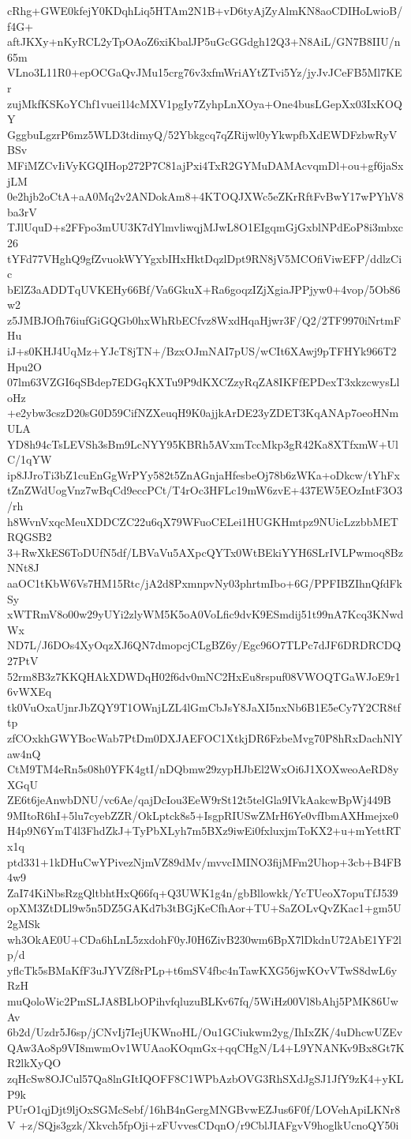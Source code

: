 cRhg+GWE0kfejY0KDqhLiq5HTAm2N1B+vD6tyAjZyAlmKN8aoCDIHoLwioB/f4G+
aftJKXy+nKyRCL2yTpOAoZ6xiKbalJP5uGcGGdgh12Q3+N8AiL/GN7B8IIU/n65m
VLno3L11R0+epOCGaQvJMu15crg76v3xfmWriAYtZTvi5Yz/jyJvJCeFB5Ml7KEr
zujMkfKSKoYChf1vuei1l4cMXV1pgIy7ZyhpLnXOya+One4busLGepXx03IxKOQY
GggbuLgzrP6mz5WLD3tdimyQ/52Ybkgcq7qZRijwl0yYkwpfbXdEWDFzbwRyVBSv
MFiMZCvIiVyKGQIHop272P7C81ajPxi4TxR2GYMuDAMAcvqmDl+ou+gf6jaSxjLM
0e2hjb2oCtA+aA0Mq2v2ANDokAm8+4KTOQJXWc5eZKrRftFvBwY17wPYhV8ba3rV
TJlUquD+s2FFpo3mUU3K7dYlmvliwqjMJwL8O1EIgqmGjGxblNPdEoP8i3mbxc26
tYFd77VHghQ9gfZvuokWYYgxbIHxHktDqzlDpt9RN8jV5MCOfiViwEFP/ddlzCic
bElZ3aADDTqUVKEHy66Bf/Va6GkuX+Ra6goqzIZjXgiaJPPjyw0+4vop/5Ob86w2
z5JMBJOfh76iufGiGQGb0hxWhRbECfvz8WxdHqaHjwr3F/Q2/2TF9970iNrtmFHu
iJ+s0KHJ4UqMz+YJcT8jTN+/BzxOJmNAI7pUS/wCIt6XAwj9pTFHYk966T2Hpu2O
07lm63VZGI6qSBdep7EDGqKXTu9P9dKXCZzyRqZA8IKFfEPDexT3xkzcwysLloHz
+e2ybw3cszD20sG0D59CifNZXeuqH9K0ajjkArDE23yZDET3KqANAp7oeoHNmULA
YD8h94cTsLEVSh3sBm9LcNYY95KBRh5AVxmTccMkp3gR42Ka8XTfxmW+UlC/1qYW
ip8JJroTi3bZ1cuEnGgWrPYy582t5ZnAGnjaHfesbeOj78b6zWKa+oDkcw/tYhFx
tZnZWdUogVnz7wBqCd9eccPCt/T4rOc3HFLc19mW6zvE+437EW5EOzIntF3O3/rh
h8WvnVxqcMeuXDDCZC22u6qX79WFuoCELei1HUGKHmtpz9NUicLzzbbMETRQGSB2
3+RwXkES6ToDUfN5df/LBVaVu5AXpcQYTx0WtBEkiYYH6SLrIVLPwmoq8BzNNt8J
aaOC1tKbW6Vs7HM15Rtc/jA2d8PxmnpvNy03phrtmIbo+6G/PPFIBZIhnQfdFkSy
xWTRmV8o00w29yUYi2zlyWM5K5oA0VoLfic9dvK9ESmdij51t99nA7Kcq3KNwdWx
ND7L/J6DOs4XyOqzXJ6QN7dmopcjCLgBZ6y/Egc96O7TLPc7dJF6DRDRCDQ27PtV
52rm8B3z7KKQHAkXDWDqH02f6dv0mNC2HxEu8rspuf08VWOQTGaWJoE9r16vWXEq
tk0VuOxaUjnrJbZQY9T1OWnjLZL4lGmCbJsY8JaXI5nxNb6B1E5eCy7Y2CR8tftp
zfCOxkhGWYBocWab7PtDm0DXJAEFOC1XtkjDR6FzbeMvg70P8hRxDachNlYaw4nQ
CtM9TM4eRn5s08h0YFK4gtI/nDQbmw29zypHJbEl2WxOi6J1XOXweoAeRD8yXGqU
ZE6t6jeAnwbDNU/vc6Ae/qajDcIou3EeW9rSt12t5telGla9IVkAakcwBpWj449B
9MItoR6hI+5lu7cyebZZR/OkLptck8s5+IsgpRIUSwZMrH6Ye0vfIbmAXHmejxe0
H4p9N6YmT4l3FhdZkJ+TyPbXLyh7m5BXz9iwEi0fxluxjmToKX2+u+mYettRTx1q
ptd331+1kDHuCwYPivezNjmVZ89dMv/mvvcIMINO3fijMFm2Uhop+3cb+B4FB4w9
ZaI74KiNbsRzgQltbhtHxQ66fq+Q3UWK1g4n/gbBllowkk/YcTUeoX7opuTfJ539
opXM3ZtDLl9w5n5DZ5GAKd7b3tBGjKeCfhAor+TU+SaZOLvQvZKac1+gm5U2gMSk
wh3OkAE0U+CDa6hLnL5zxdohF0yJ0H6ZivB230wm6BpX7lDkdnU72AbE1YF2lp/d
yflcTk5sBMaKfF3uJYVZf8rPLp+t6mSV4fbc4nTawKXG56jwKOvVTwS8dwL6yRzH
muQoloWic2PmSLJA8BLbOPihvfqluzuBLKv67fq/5WiHz00Vl8bAhj5PMK86UwAv
6b2d/Uzdr5J6sp/jCNvIj7IejUKWnoHL/Ou1GCiukwm2yg/IhIxZK/4uDhcwUZEv
QAw3Ao8p9VI8mwmOv1WUAaoKOqmGx+qqCHgN/L4+L9YNANKv9Bx8Gt7KR2lkXyQO
zqHcSw8OJCul57Qa8lnGItIQOFF8C1WPbAzbOVG3RhSXdJgSJ1JfY9zK4+yKLP9k
PUrO1qjDjt9ljOxSGMcSebf/16hB4nGergMNGBvwEZJus6F0f/LOVehApiLKNr8V
+z/SQjs3gzk/Xkvch5fpOji+zFUvvesCDqnO/r9CblJIAFgvV9hoglkUcnoQY50i

